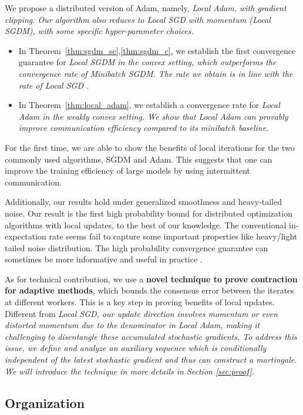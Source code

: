 \documentclass{article} %
\numberwithin{equation}{section}
\begin{document}
We propose a distributed version of Adam, namely, \em Local \em  Adam, with gradient clipping. Our algorithm also reduces to \em Local \em  SGD with momentum (\em Local \em SGDM), with some specific hyper-parameter choices.  
\begin{itemize}
    \item In Theorem~\ref{thm:sgdm_sc},\ref{thm:sgdm_c}, we establish the first convergence guarantee for \em Local \em SGDM in the convex setting, which outperforms the convergence rate of \em Minibatch \em SGDM. The rate we obtain is in line with the rate of \em Local \em SGD \citep{woodworth2020local} .
    \item In Theorem~\ref{thm:local_adam}, we establish a convergence rate for \em Local \em Adam in the weakly convex setting. We show that \em Local \em Adam can provably improve communication efficiency compared to its minibatch baseline.
\end{itemize}
For the first time, we are able to show the benefits of local iterations for the two commonly used algorithms, SGDM and Adam. This suggests that one can improve the training efficiency of large models by using intermittent communication.

Additionally, our results hold under generalized smoothness and heavy-tailed noise. Our result is the first high probability bound for distributed optimization algorithms with local updates, to the best of our knowledge.
The conventional in-expectation rate seems fail to capture some important properties like heavy/light tailed noise distribution.
The high probability convergence guarantee can sometimes be more informative and useful in practice \citep{gorbunov2020stochastic}. 

As for technical contribution, we use a \textbf{novel technique to prove contraction for adaptive methods}, which bounds the consensus error between the iterates at different workers. 
This is a key step in proving benefits of local updates.
Different from \em Local \em SGD, our update direction involves momentum or even distorted momentum due to the denominator in \em Local \em Adam, making it challenging to disentangle these accumulated stochastic gradients. 
To address this issue, we define and analyze an auxiliary sequence which is conditionally independent of the latest stochastic gradient and thus can construct a martingale. 
We will introduce the technique in more details in Section \ref{sec:proof}.

\subsection{Organization}
\end{document}
